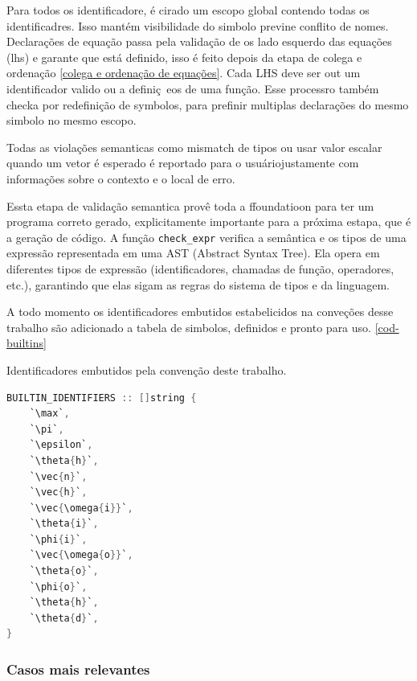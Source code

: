Para todos os identificadore, é cirado um escopo global contendo todas os identificadres. Isso mantém visibilidade do simbolo  previne conflito de nomes. Declarações de equação passa pela validação de os lado esquerdo das equações (lhs) e garante que está definido, isso é feito depois da etapa de colega e ordenação \autoref{colega e ordenação de equações}. Cada LHS deve ser out um identificador valido ou a definiç~eos de uma função. Esse processro também checka por redefinição de symbolos, para prefinir multiplas declarações do mesmo simbolo no mesmo escopo.


Todas as violações semanticas como mismatch de tipos ou usar valor escalar quando um vetor é esperado é reportado para o usuáriojustamente com informações sobre o contexto e o local de erro.


Essta etapa de validação semantica provê toda a ffoundatioon para ter um programa correto gerado, explicitamente importante para a próxima estapa, que é a geração de código.
A função \verb`check_expr` verifica a semântica e os tipos de uma expressão representada em uma AST (Abstract Syntax Tree). Ela opera em diferentes tipos de expressão (identificadores, chamadas de função, operadores, etc.), garantindo que elas sigam as regras do sistema de tipos e da linguagem.

A todo momento os identificadores embutidos estabelicidos na conveções desse trabalho são adicionado a tabela de simbolos, definidos e pronto para uso. \autoref{cod-builtins}

\begin{codigo}[htb]
    \caption{\small Identificadores embutidos pela convenção deste trabalho. }
    \label{cod-builtins}
\begin{lstlisting}[language=C, numbers=none, frame=none, inputencoding=latin1]
BUILTIN_IDENTIFIERS :: []string {
    `\max`,
    `\pi`,
    `\epsilon`,
    `\theta{h}`,
    `\vec{n}`,
    `\vec{h}`,
    `\vec{\omega{i}}`,
    `\theta{i}`,
    `\phi{i}`,
    `\vec{\omega{o}}`,
    `\theta{o}`,
    `\phi{o}`,
    `\theta{h}`,
    `\theta{d}`,
}
\end{lstlisting}
\end{codigo}


\subsubsection{Casos mais relevantes}

